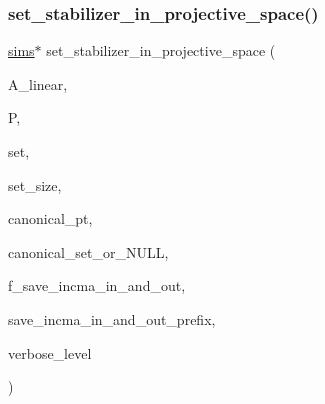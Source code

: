 \mbox{\label{action__global_8_c_a31f8ae4c4f20b45ca5a88c3f8c75d2be}} 
\subsubsection{\texorpdfstring{set\+\_\+stabilizer\+\_\+in\+\_\+projective\+\_\+space()}{set\_stabilizer\_in\_projective\_space()}}
{\footnotesize\ttfamily \mbox{\hyperlink{classsims}{sims}}$\ast$ set\+\_\+stabilizer\+\_\+in\+\_\+projective\+\_\+space (\begin{DoxyParamCaption}\item[{\mbox{\hyperlink{classaction}{action}} $\ast$}]{A\+\_\+linear,  }\item[{\mbox{\hyperlink{classprojective__space}{projective\+\_\+space}} $\ast$}]{P,  }\item[{\mbox{\hyperlink{galois_8h_a09fddde158a3a20bd2dcadb609de11dc}{I\+NT}} $\ast$}]{set,  }\item[{\mbox{\hyperlink{galois_8h_a09fddde158a3a20bd2dcadb609de11dc}{I\+NT}}}]{set\+\_\+size,  }\item[{\mbox{\hyperlink{galois_8h_a09fddde158a3a20bd2dcadb609de11dc}{I\+NT}} \&}]{canonical\+\_\+pt,  }\item[{\mbox{\hyperlink{galois_8h_a09fddde158a3a20bd2dcadb609de11dc}{I\+NT}} $\ast$}]{canonical\+\_\+set\+\_\+or\+\_\+\+N\+U\+LL,  }\item[{\mbox{\hyperlink{galois_8h_a09fddde158a3a20bd2dcadb609de11dc}{I\+NT}}}]{f\+\_\+save\+\_\+incma\+\_\+in\+\_\+and\+\_\+out,  }\item[{const \mbox{\hyperlink{galois_8h_ab6cc7b4aeb6ea31aba2b3fbfc83ff5e6}{B\+Y\+TE}} $\ast$}]{save\+\_\+incma\+\_\+in\+\_\+and\+\_\+out\+\_\+prefix,  }\item[{\mbox{\hyperlink{galois_8h_a09fddde158a3a20bd2dcadb609de11dc}{I\+NT}}}]{verbose\+\_\+level }\end{DoxyParamCaption})}

\mbox{\label{action__global_8_c_a2e0b825af702a050bcceab8f5f4ae40d}} 
